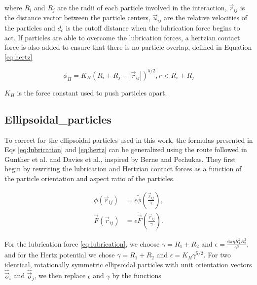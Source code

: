 where $R_i$ and $R_j$ are the radii of each particle involved in the interaction, $\vec{r}_{ij}$ is the distance
vector between the particle centers, $\vec{u}_{ij}$ are the relative velocities of the particles and $d_c$ 
is the cutoff distance when the lubrication force begins to act. If particles are able to overcome the lubrication forces, 
a hertzian contact force is also added to ensure that there is no particle overlap, defined in Equation \eqref{eq:hertz}

\begin{equation}
    \phi_{H} = K_{H}(R_i + R_j - |\vec{r}_{ij}|)^{5/2}, r < R_i + R_j
    \label{eq:hertz}
\end{equation}

$K_H$ is the force constant used to push particles apart. 

\subsection{Ellipsoidal_particles}
\label{section:ellipsoidal_particles}

To correct for the ellipsoidal particles used in this work, 
the formulas presented in Eqs \ref{eq:lubrication} and \ref{eq:hertz} can be generalized using the route followed 
in Gunther et al. and Davies et al., inspired by Berne and Pechukas. \cite{gunther_timescales_2014, davies_interface_2014} 
They first begin by rewriting the lubrication and Hertzian contact forces as a function of the particle orientation and 
aspect ratio of the particles.

\begin{equation}
    \begin{split}
    \phi(\vec{r}_{ij}) &= {\epsilon} \tilde{\phi}\left(\frac{\vec{r}_{ij}}{{\gamma}}\right) , \\
    \vec{F}(\vec{r}_{ij}) &= {\epsilon} \tilde{\vec{F}}\left(\frac{\vec{r}_{ij}}{{\gamma}}\right) .
    \end{split}
\end{equation}

For the lubrication force \eqref{eq:lubrication}, we choose
${\gamma}=R_1+R_2$ and ${\epsilon}=\frac{6\pi\eta R_1^2 R_2^2}{{\gamma^3}}$, and for the
Hertz potential we chose ${\gamma}=R_1+R_2$ and ${\epsilon}=K_H\gamma^{5/2}$. For two identical, rotationally
symmetric ellipsoidal particles with unit orientation vectors $\hat{\vec{o}}_i$ and $\hat{\vec{o}}_j$, we then replace $\epsilon$ and $\gamma$ by
the functions

